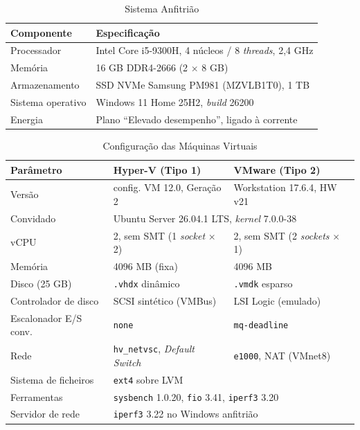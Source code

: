 \documentclass[conference]{IEEEtran}
\begin{document}
\begin{table}[t]
\caption{Sistema Anfitrião}
\label{tab_host}
\centering
\footnotesize
\begin{tabular}{@{}ll@{}}
\toprule
\textbf{Componente} & \textbf{Especificação} \\
\midrule
Processador & Intel Core i5-9300H, 4 núcleos / 8 \textit{threads}, 2,4 GHz \\
Memória & 16 GB DDR4-2666 (2 $\times$ 8 GB) \\
Armazenamento & SSD NVMe Samsung PM981 (MZVLB1T0), 1 TB \\
Sistema operativo & Windows 11 Home 25H2, \textit{build} 26200 \\
Energia & Plano ``Elevado desempenho'', ligado à corrente \\
\bottomrule
\end{tabular}
\end{table}

\begin{table}[t]
\caption{Configuração das Máquinas Virtuais}
\label{tab_vm}
\centering
\scriptsize
\setlength{\tabcolsep}{2pt}
\begin{tabular}{@{}lll@{}}
\toprule
\textbf{Parâmetro} & \textbf{Hyper-V (Tipo 1)} & \textbf{VMware (Tipo 2)} \\
\midrule
Versão & config. VM 12.0, Geração 2 & Workstation 17.6.4, HW v21 \\
Convidado & \multicolumn{2}{l}{Ubuntu Server 26.04.1 LTS, \textit{kernel} 7.0.0-38} \\
vCPU & 2, sem SMT (1 \textit{socket} $\times$ 2) & 2, sem SMT (2 \textit{sockets} $\times$ 1) \\
Memória & 4096 MB (fixa) & 4096 MB \\
Disco (25 GB) & \texttt{.vhdx} dinâmico & \texttt{.vmdk} esparso \\
Controlador de disco & SCSI sintético (VMBus) & LSI Logic (emulado) \\
Escalonador E/S conv. & \texttt{none} & \texttt{mq-deadline} \\
Rede & \texttt{hv\_netvsc}, \textit{Default Switch} & \texttt{e1000}, NAT (VMnet8) \\
Sistema de ficheiros & \multicolumn{2}{l}{\texttt{ext4} sobre LVM} \\
Ferramentas & \multicolumn{2}{l}{\texttt{sysbench} 1.0.20, \texttt{fio} 3.41, \texttt{iperf3} 3.20} \\
Servidor de rede & \multicolumn{2}{l}{\texttt{iperf3} 3.22 no Windows anfitrião} \\
\bottomrule
\end{tabular}
\end{table}
\end{document}
